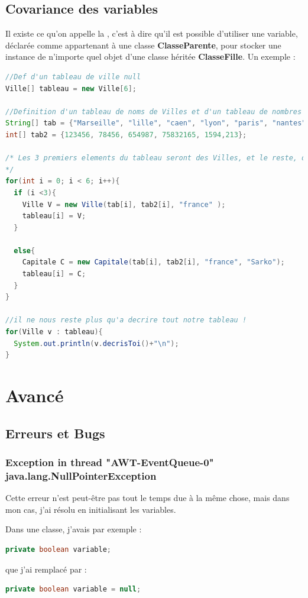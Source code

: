 \documentclass[a4paper,twoside]{article}
\begin{document}
\subsection{Covariance des variables}
Il existe ce qu'on appelle la , c'est à dire qu'il est possible d'utiliser une variable, déclarée comme appartenant à une classe \textbf{ClasseParente}, pour stocker une instance de n'importe quel objet d'une classe héritée \textbf{ClasseFille}. Un exemple :
\begin{lstlisting}[language=java]
//Def d'un tableau de ville null
Ville[] tableau = new Ville[6];
    
//Definition d'un tableau de noms de Villes et d'un tableau de nombres d'habitants
String[] tab = {"Marseille", "lille", "caen", "lyon", "paris", "nantes"};
int[] tab2 = {123456, 78456, 654987, 75832165, 1594,213};

/* Les 3 premiers elements du tableau seront des Villes, et le reste, des capitales
*/
for(int i = 0; i < 6; i++){
  if (i <3){
    Ville V = new Ville(tab[i], tab2[i], "france" );
    tableau[i] = V;
  }

  else{
    Capitale C = new Capitale(tab[i], tab2[i], "france", "Sarko");
    tableau[i] = C;
  }
}

//il ne nous reste plus qu'a decrire tout notre tableau !
for(Ville v : tableau){
  System.out.println(v.decrisToi()+"\n");
}
\end{lstlisting}

\section{Avancé}
\subsection{Erreurs et Bugs}
\subsubsection{Exception in thread "AWT-EventQueue-0" java.lang.NullPointerException}
Cette erreur n'est peut-être pas tout le temps due à la même chose, mais dans mon cas, j'ai résolu en initialisant les variables. 

Dans une classe, j'avais par exemple : 
\begin{lstlisting}[language=java]
private boolean variable;
\end{lstlisting}
que j'ai remplacé par :
\begin{lstlisting}[language=java]
private boolean variable = null;
\end{lstlisting}
\end{document}
